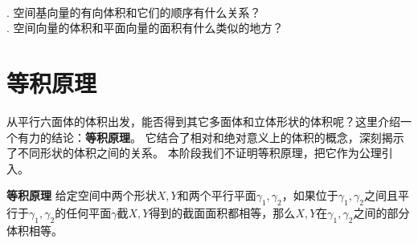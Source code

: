 \documentclass[12pt,UTF8]{ctexbook}
\begin{document}
\begin{sk}
    \mbox{} \\
    . 空间基向量的有向体积和它们的顺序有什么关系？  \\
    . 空间向量的体积和平面向量的面积有什么类似的地方？
\end{sk}

\section{等积原理}

从平行六面体的体积出发，能否得到其它多面体和立体形状的体积呢？这里介绍一个有力的结论：\textbf{等积原理}。
它结合了相对和绝对意义上的体积的概念，深刻揭示了不同形状的体积之间的关系。
本阶段我们不证明等积原理，把它作为公理引入。
\begin{po}{\textbf{等积原理}}\label{po:6}
    给定空间中两个形状$X,Y$和两个平行平面$\gamma_1,\gamma_2$，如果位于$\gamma_1,\gamma_2$之间且平行于$\gamma_1,\gamma_2$的任何平面$\gamma$截$X,Y$得到的截面面积都相等，那么$X,Y$在$\gamma_1,\gamma_2$之间的部分体积相等。
\end{po}
\end{document}
